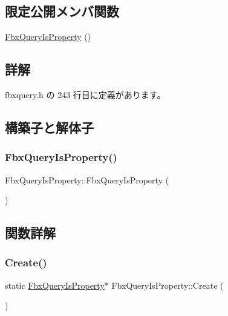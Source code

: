 \subsection*{限定公開メンバ関数}
\begin{DoxyCompactItemize}
\item 
\hyperlink{class_fbx_query_is_property_a7be21bf324d9b47b76ec34af5fc95d86}{Fbx\+Query\+Is\+Property} ()
\end{DoxyCompactItemize}


\subsection{詳解}


 fbxquery.\+h の 243 行目に定義があります。



\subsection{構築子と解体子}
\mbox{\label{class_fbx_query_is_property_a7be21bf324d9b47b76ec34af5fc95d86}} 
\subsubsection{\texorpdfstring{Fbx\+Query\+Is\+Property()}{FbxQueryIsProperty()}}
{\footnotesize\ttfamily Fbx\+Query\+Is\+Property\+::\+Fbx\+Query\+Is\+Property (\begin{DoxyParamCaption}{ }\end{DoxyParamCaption})\hspace{0.3cm}{\ttfamily [protected]}}



\subsection{関数詳解}
\mbox{\label{class_fbx_query_is_property_a9f9b91b8ea513a71c28d4e66654fb47f}} 
\subsubsection{\texorpdfstring{Create()}{Create()}}
{\footnotesize\ttfamily static \hyperlink{class_fbx_query_is_property}{Fbx\+Query\+Is\+Property}$\ast$ Fbx\+Query\+Is\+Property\+::\+Create (\begin{DoxyParamCaption}{ }\end{DoxyParamCaption})\hspace{0.3cm}{\ttfamily [static]}}

